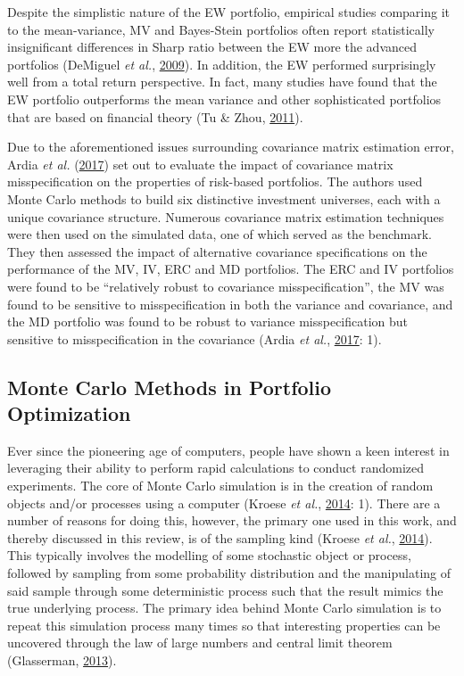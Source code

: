 \documentclass[11pt,preprint, authoryear]{elsarticle}
\numberwithin{equation}{section}
\numberwithin{figure}{section}
\numberwithin{table}{section}
\begin{document}
Despite the simplistic nature of the EW portfolio, empirical studies
comparing it to the mean-variance, MV and Bayes-Stein portfolios often
report statistically insignificant differences in Sharp ratio between
the EW more the advanced portfolios (DeMiguel \emph{et al.},
\protect\hyperlink{ref-demiguel2009}{2009}). In addition, the EW
performed surprisingly well from a total return perspective. In fact,
many studies have found that the EW portfolio outperforms the mean
variance and other sophisticated portfolios that are based on financial
theory (Tu \& Zhou, \protect\hyperlink{ref-tu2011}{2011}).

Due to the aforementioned issues surrounding covariance matrix
estimation error, Ardia \emph{et al.}
(\protect\hyperlink{ref-ardia2017}{2017}) set out to evaluate the impact
of covariance matrix misspecification on the properties of risk-based
portfolios. The authors used Monte Carlo methods to build six
distinctive investment universes, each with a unique covariance
structure. Numerous covariance matrix estimation techniques were then
used on the simulated data, one of which served as the benchmark. They
then assessed the impact of alternative covariance specifications on the
performance of the MV, IV, ERC and MD portfolios. The ERC and IV
portfolios were found to be ``relatively robust to covariance
misspecification'', the MV was found to be sensitive to misspecification
in both the variance and covariance, and the MD portfolio was found to
be robust to variance misspecification but sensitive to misspecification
in the covariance (Ardia \emph{et al.},
\protect\hyperlink{ref-ardia2017}{2017}: 1).

\hypertarget{monte-carlo-methods-in-portfolio-optimization}{%
\subsection{Monte Carlo Methods in Portfolio
Optimization}\label{monte-carlo-methods-in-portfolio-optimization}}

Ever since the pioneering age of computers, people have shown a keen
interest in leveraging their ability to perform rapid calculations to
conduct randomized experiments. The core of Monte Carlo simulation is in
the creation of random objects and/or processes using a computer (Kroese
\emph{et al.}, \protect\hyperlink{ref-kroese2014}{2014}: 1). There are a
number of reasons for doing this, however, the primary one used in this
work, and thereby discussed in this review, is of the sampling kind
(Kroese \emph{et al.}, \protect\hyperlink{ref-kroese2014}{2014}). This
typically involves the modelling of some stochastic object or process,
followed by sampling from some probability distribution and the
manipulating of said sample through some deterministic process such that
the result mimics the true underlying process. The primary idea behind
Monte Carlo simulation is to repeat this simulation process many times
so that interesting properties can be uncovered through the law of large
numbers and central limit theorem (Glasserman,
\protect\hyperlink{ref-glasserman2013}{2013}).
\end{document}
